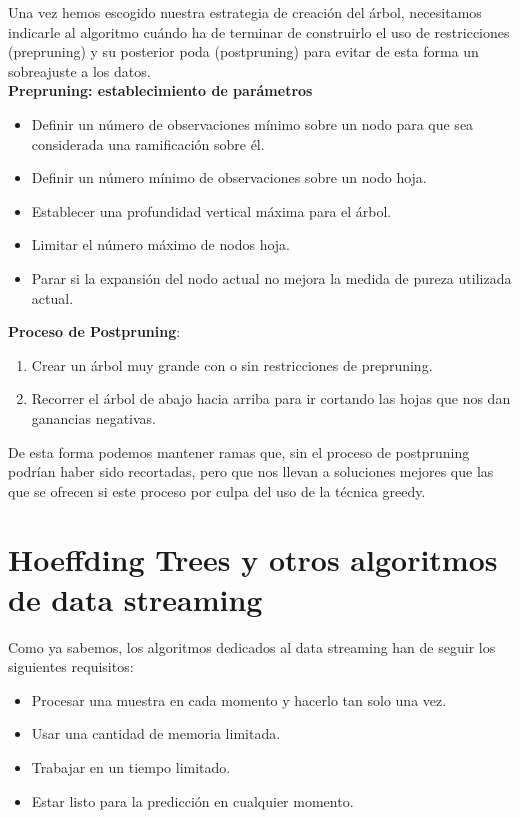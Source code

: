 Una vez hemos escogido nuestra estrategia de creación del árbol, necesitamos indicarle al algoritmo cuándo ha de terminar de construirlo el uso de restricciones (prepruning) y su posterior poda (postpruning) para evitar de esta forma un sobreajuste a los datos.\\

\textbf{Prepruning: establecimiento de parámetros}
\begin{itemize}
	\item Definir un número de observaciones mínimo sobre un nodo para que sea considerada una ramificación sobre él.
	\item Definir un número mínimo de observaciones sobre un nodo hoja.
	\item Establecer una profundidad vertical máxima para el árbol.
	\item Limitar el número máximo de nodos hoja.
	\item Parar si la expansión del nodo actual no mejora la medida de pureza utilizada actual.
\end{itemize}

\textbf{Proceso de Postpruning}:
\begin{enumerate}
	\item Crear un árbol muy grande con o sin restricciones de prepruning.
	\item Recorrer el árbol de abajo hacia arriba para ir cortando las hojas que nos dan ganancias negativas.
\end{enumerate}

De esta forma podemos mantener ramas que, sin el proceso de postpruning podrían haber sido recortadas, pero que nos llevan a soluciones mejores que las que se ofrecen si este proceso por culpa del uso de la técnica greedy.


\section{Hoeffding Trees y otros algoritmos de data streaming}

Como ya sabemos, los algoritmos dedicados al data streaming han de seguir los siguientes requisitos:
\begin{itemize}
	\item Procesar una muestra en cada momento y hacerlo tan solo una vez.
	\item Usar una cantidad de memoria limitada.
	\item Trabajar en un tiempo limitado.
	\item Estar listo para la predicción en cualquier momento.
\end{itemize}

